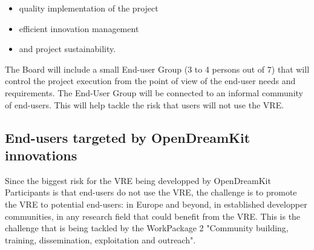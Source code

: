 \documentclass{deliverablereport}
\begin{document}
\begin{itemize}
\item{quality implementation of the project}
\item{efficient innovation management}
\item{and project sustainability.}
\end{itemize}

The Board will include a small End-user Group (3 to 4 persons out of 7) that will control the project execution from the point of view of the end-user needs and requirements. The End-User Group will be connected to an informal community of end-users. This will help tackle the risk that users will not use the VRE.

\subsection{End-users targeted by OpenDreamKit innovations}

Since the biggest risk for the VRE being developped by OpenDreamKit Participants is that end-users do not use the VRE, the challenge is to promote the VRE to potential end-users: in Europe and beyond, in established developper communities, in any research field that could benefit from the VRE. This is the challenge that is being tackled by the WorkPackage 2 "Community building, training, dissemination, exploitation and outreach".
\end{document}
